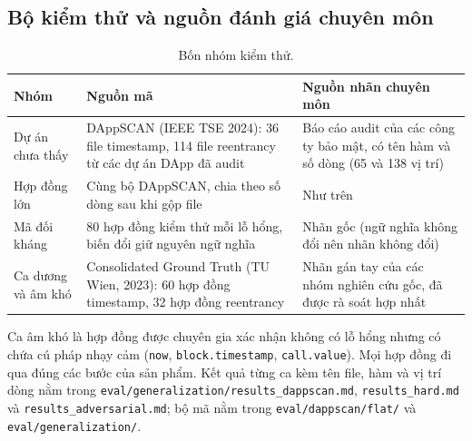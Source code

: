 \documentclass[12pt,a4paper]{article}
\newcommand{\code}[1]{\texttt{#1}}
\begin{document}
\subsection{Bộ kiểm thử và nguồn đánh giá chuyên môn}
\begin{table}[H]\centering\small
\caption{Bốn nhóm kiểm thử.}\label{tab:sets}
\begin{tabularx}{\textwidth}{lYY}
\toprule
Nhóm & Nguồn mã & Nguồn nhãn chuyên môn\\
\midrule
Dự án chưa thấy & DAppSCAN (IEEE TSE 2024): 36 file timestamp, 114 file reentrancy từ các dự án DApp đã audit & Báo cáo audit của các công ty bảo mật, có tên hàm và số dòng (65 và 138 vị trí)\\
Hợp đồng lớn & Cùng bộ DAppSCAN, chia theo số dòng sau khi gộp file & Như trên\\
Mã đối kháng & 80 hợp đồng kiểm thử mỗi lỗ hổng, biến đổi giữ nguyên ngữ nghĩa & Nhãn gốc (ngữ nghĩa không đổi nên nhãn không đổi)\\
Ca dương và âm khó & Consolidated Ground Truth (TU Wien, 2023): 60 hợp đồng timestamp, 32 hợp đồng reentrancy & Nhãn gán tay của các nhóm nghiên cứu gốc, đã được rà soát hợp nhất\\
\bottomrule
\end{tabularx}
\end{table}
Ca âm khó là hợp đồng được chuyên gia xác nhận không có lỗ hổng nhưng có chứa cú pháp nhạy cảm (\code{now}, \code{block.timestamp}, \code{call.value}). Mọi hợp đồng đi qua đúng các bước của sản phẩm. Kết quả từng ca kèm tên file, hàm và vị trí dòng nằm trong \code{eval/generalization/results\_dappscan.md}, \code{results\_hard.md} và \code{results\_adversarial.md}; bộ mã nằm trong \code{eval/dappscan/flat/} và \code{eval/generalization/}.
\end{document}
